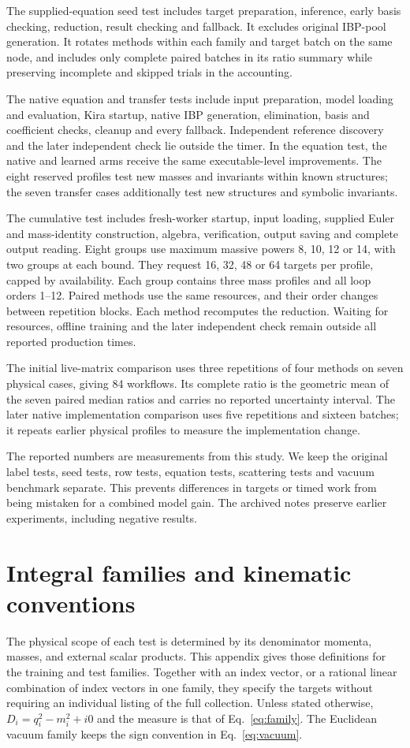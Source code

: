 The supplied-equation seed test includes target preparation, inference, early basis checking, reduction, result checking and fallback. It excludes original IBP-pool generation. It rotates methods within each family and target batch on the same node, and includes only complete paired batches in its ratio summary while preserving incomplete and skipped trials in the accounting.

The native equation and transfer tests include input preparation, model loading and evaluation, Kira startup, native IBP generation, elimination, basis and coefficient checks, cleanup and every fallback. Independent reference discovery and the later independent check lie outside the timer. In the equation test, the native and learned arms receive the same executable-level improvements. The eight reserved profiles test new masses and invariants within known structures; the seven transfer cases additionally test new structures and symbolic invariants.

The cumulative test includes fresh-worker startup, input loading, supplied Euler and mass-identity construction, algebra, verification, output saving and complete output reading. Eight groups use maximum massive powers 8, 10, 12 or 14, with two groups at each bound. They request 16, 32, 48 or 64 targets per profile, capped by availability. Each group contains three mass profiles and all loop orders 1--12. Paired methods use the same resources, and their order changes between repetition blocks. Each method recomputes the reduction. Waiting for resources, offline training and the later independent check remain outside all reported production times.

The initial live-matrix comparison uses three repetitions of four methods on seven physical cases, giving 84 workflows. Its complete ratio is the geometric mean of the seven paired median ratios and carries no reported uncertainty interval. The later native implementation comparison uses five repetitions and sixteen batches; it repeats earlier physical profiles to measure the implementation change.

The reported numbers are measurements from this study. We keep the original label tests, seed tests, row tests, equation tests, scattering tests and vacuum benchmark separate. This prevents differences in targets or timed work from being mistaken for a combined model gain. The archived notes preserve earlier experiments, including negative results.

\section{Integral families and kinematic conventions}
\label{app:families}
The physical scope of each test is determined by its denominator momenta, masses, and external scalar products. This appendix gives those definitions for the training and test families. Together with an index vector, or a rational linear combination of index vectors in one family, they specify the targets without requiring an individual listing of the full collection. Unless stated otherwise, $D_i=q_i^2-m_i^2+i0$ and the measure is that of Eq.~\eqref{eq:family}. The Euclidean vacuum family keeps the sign convention in Eq.~\eqref{eq:vacuum}.

